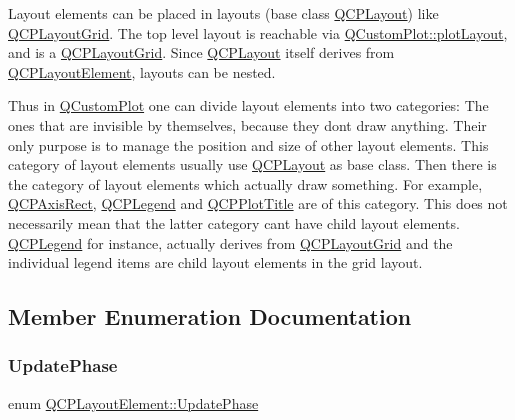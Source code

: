 Layout elements can be placed in layouts (base class \mbox{\hyperlink{class_q_c_p_layout}{Q\+C\+P\+Layout}}) like \mbox{\hyperlink{class_q_c_p_layout_grid}{Q\+C\+P\+Layout\+Grid}}. The top level layout is reachable via \mbox{\hyperlink{class_q_custom_plot_af1a1f1f571237deb7c2bd34a5e9f018f}{Q\+Custom\+Plot\+::plot\+Layout}}, and is a \mbox{\hyperlink{class_q_c_p_layout_grid}{Q\+C\+P\+Layout\+Grid}}. Since \mbox{\hyperlink{class_q_c_p_layout}{Q\+C\+P\+Layout}} itself derives from \mbox{\hyperlink{class_q_c_p_layout_element}{Q\+C\+P\+Layout\+Element}}, layouts can be nested.

Thus in \mbox{\hyperlink{class_q_custom_plot}{Q\+Custom\+Plot}} one can divide layout elements into two categories\+: The ones that are invisible by themselves, because they don\textquotesingle{}t draw anything. Their only purpose is to manage the position and size of other layout elements. This category of layout elements usually use \mbox{\hyperlink{class_q_c_p_layout}{Q\+C\+P\+Layout}} as base class. Then there is the category of layout elements which actually draw something. For example, \mbox{\hyperlink{class_q_c_p_axis_rect}{Q\+C\+P\+Axis\+Rect}}, \mbox{\hyperlink{class_q_c_p_legend}{Q\+C\+P\+Legend}} and \mbox{\hyperlink{class_q_c_p_plot_title}{Q\+C\+P\+Plot\+Title}} are of this category. This does not necessarily mean that the latter category can\textquotesingle{}t have child layout elements. \mbox{\hyperlink{class_q_c_p_legend}{Q\+C\+P\+Legend}} for instance, actually derives from \mbox{\hyperlink{class_q_c_p_layout_grid}{Q\+C\+P\+Layout\+Grid}} and the individual legend items are child layout elements in the grid layout. 

\subsection{Member Enumeration Documentation}
\mbox{\label{class_q_c_p_layout_element_a0d83360e05735735aaf6d7983c56374d}} 
\subsubsection{\texorpdfstring{Update\+Phase}{UpdatePhase}}
{\footnotesize\ttfamily enum \mbox{\hyperlink{class_q_c_p_layout_element_a0d83360e05735735aaf6d7983c56374d}{Q\+C\+P\+Layout\+Element\+::\+Update\+Phase}}}

